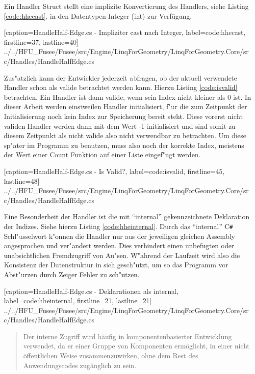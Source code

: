 \documentclass[pagesize, paper=a4, fontsize=12pt,titlepage=true, headings=small, headnosepline, abstractoff, liststotoc, nochapterprefix, plainheadsepline]{scrreprt}
\newcommand{\CSS}{C\texttt{\# }}
\begin{document}
Ein Handler Struct stellt eine implizite Konvertierung des Handlers, siehe Listing \ref{code:hhecast}, in den Datentypen Integer (int) zur Verfügung.

			[caption={HandleHalf-Edge.cs - Impliziter cast nach Integer}, label=code:hhecast, firstline=37, lastline=40]
			{../../HFU_Fusee/Fusee/src/Engine/LinqForGeometry/LinqForGeometry.Core/src/Handles/HandleHalfEdge.cs}

Zus"atzlich kann der Entwickler jederzeit abfragen, ob der aktuell verwendete Handler schon als valide betrachtet werden kann. Hierzu Listing \ref{code:isvalid} betrachten. Ein Handler ist dann valide, wenn sein Index nicht kleiner als 0 ist. In dieser Arbeit werden einstweilen Handler initialisiert, f"ur die zum Zeitpunkt der Initialisierung noch kein Index zur Speicherung bereit steht. Diese vorerst nicht validen Handler werden dann mit dem Wert -1 initialisiert und sind somit zu diesem Zeitpunkt als nicht valide also nicht verwendbar zu betrachten. Um diese sp"ater im Programm zu benutzen, muss also noch der korrekte Index, meistens der Wert einer Count Funktion auf einer Liste eingef"ugt werden.

			[caption={HandleHalf-Edge.cs - Is Valid?}, label=code:isvalid, firstline=45, lastline=48]
			{../../HFU_Fusee/Fusee/src/Engine/LinqForGeometry/LinqForGeometry.Core/src/Handles/HandleHalfEdge.cs}

Eine Besonderheit der Handler ist die mit "`internal"' gekennzeichnete Deklaration der Indizes. Siehe hierzu Listing \ref{code:hheinternal}. Durch das "`internal"' \CSS Schl"usselwort k"onnen die Handler nur aus der jeweiligen gleichen Assembly angesprochen und ver"andert werden. Dies verhindert einen unbefugten oder unabsichtlichen Fremdzugriff von Au"sen. W"ahrend der Laufzeit wird also die Konsistenz der Datenstruktur in sich gesch"utzt, um so das Programm vor Abst"urzen durch Zeiger Fehler zu sch"utzen.

			[caption={HandleHalf-Edge.cs - Deklarationen als internal}, label=code:hheinternal, firstline=21, lastline=21]
			{../../HFU_Fusee/Fusee/src/Engine/LinqForGeometry/LinqForGeometry.Core/src/Handles/HandleHalfEdge.cs}

\begin{quote}{\dq}Der interne Zugriff wird h{\"a}ufig in komponentenbasierter Entwicklung verwendet, da er einer Gruppe von Komponenten erm{\"o}glicht, in einer nicht {\"o}ffentlichen Weise zusammenzuwirken, ohne dem Rest des Anwendungscodes zug{\"a}nglich zu sein.{\dq} \cite{MicrosoftCReferenz.2013}\end{quote}
\end{document}
